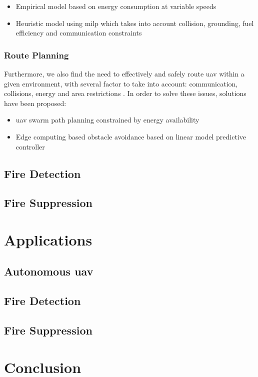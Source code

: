 \documentclass[runningheads]{llncs}
\begin{document}
\begin{itemize}
	\item Empirical model based on energy consumption at variable speeds \cite{inproceedings1}
	\item Heuristic model using \acrfull{milp} which takes into account collision, grounding, fuel efficiency and communication constraints \cite{Grotli2012} 
\end{itemize}

\subsubsection{Route Planning}

Furthermore, we also find the need to effectively and safely route \acrshort{uav} within a given environment, with several factor to take into account: communication, collisions, energy and area restrictions \cite{inproceedings}. In order to solve these issues, solutions have been proposed:

\begin{itemize}
	\item \acrshort{uav} swarm path planning constrained by energy availability \cite{inproceedings}
	\item Edge computing based obstacle avoidance based on linear model predictive controller \cite{inproceedings2}
\end{itemize}

\subsection{Fire Detection}

\subsection{Fire Suppression}

\section{Applications}

\subsection{Autonomous \acrshort{uav}}

\subsection{Fire Detection}

\subsection{Fire Suppression}

\section{Conclusion}


\end{document}
